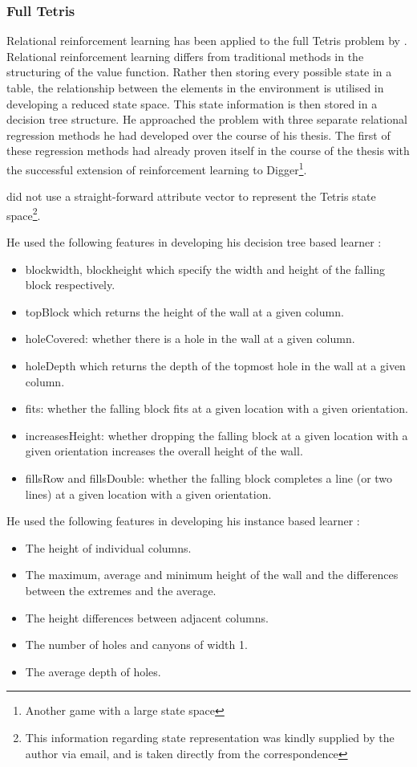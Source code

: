 \documentclass[a4paper]{article}%
\begin{document}
\subsubsection{Full Tetris}
Relational reinforcement learning has been applied to the full Tetris problem by \cite{kurt}. Relational reinforcement learning differs from traditional methods in the structuring of the value function. Rather then storing every possible state in a table, the relationship between the elements in the environment is utilised in developing a reduced state space. This state information is then stored in a decision tree structure.   He approached the problem with three separate relational regression methods \citep{kurt} he had developed over the course of his thesis. The first of these regression methods had already proven itself in the course of the thesis with the successful extension of reinforcement learning to Digger\footnote{Another game with a large state space}. 
 
\cite{kurt} did not use a straight-forward attribute vector to represent the Tetris state space\footnote{This information regarding state representation was kindly supplied by the author via email, and is taken directly from the correspondence}.

He used the following features in developing his decision tree based learner : \\

\begin{itemize}
\item{ blockwidth, blockheight which specify the width and height of the
falling block respectively.}
\item{ topBlock which returns the height of the wall at a given column.}
\item{ holeCovered: whether there is a hole in the wall at a given column.}
\item{ holeDepth which returns the depth of the topmost hole in the wall at a
given column.}
\item{ fits: whether the falling block fits at a given location with a given
orientation.}
\item{ increasesHeight: whether dropping the falling block at a given
location with a given orientation increases the overall height of the wall.}
\item{ fillsRow and fillsDouble: whether the falling block completes a line
(or two lines) at a given location with a given orientation.}
\end{itemize}
He used the following features in developing his instance based learner : \\
\begin{itemize}
\item{ The height of individual columns.}
\item{ The maximum, average and minimum height of the wall and the
differences between the extremes and the average.}
\item{ The height differences between adjacent columns.}
\item{ The number of holes and canyons of width 1.}
\item{ The average depth of holes.}
\end{itemize}
\end{document}
